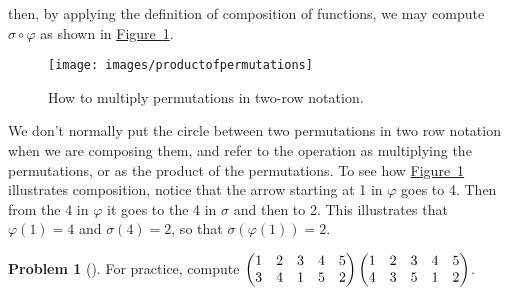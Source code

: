 \documentclass[10pt,]{book}
\theoremstyle{plain}
\theoremstyle{definition}
\newtheorem{activity}[project]{Problem}
\theoremstyle{definition}
\numberwithin{equation}{chapter}
\newcommand{\amp}{&}
\begin{document}
then, by applying the definition of composition of functions, we may compute \(\sigma\circ
\varphi\) as shown in \hyperref[permutationproduct]{Figure~\ref{permutationproduct}}.%
\begin{figure}
\centering
\texttt{[image: images/productofpermutations]}
\caption{How to multiply permutations in two-row notation.\label{permutationproduct}}
\end{figure}
\hypertarget{p-1500}{}%
We don't normally put the circle between two permutations in two row notation when we are composing them, and refer to the operation as multiplying the permutations, or as the product of the permutations. To see how \hyperref[permutationproduct]{Figure~\ref{permutationproduct}} illustrates composition, notice that the arrow starting at 1 in \(\varphi\) goes to 4. Then from the 4 in \(\varphi\) it goes to the 4 in \(\sigma\) and then to 2. This illustrates that \(\varphi(1)=4\) and \(\sigma(4) =2\), so that \(\sigma(\varphi(1))=2\).%
\begin{activity}[]\marginsymbol[-1em]{} \label{activity-258}
\hypertarget{p-1501}{}%
For practice, compute \(\begin{pmatrix}1\amp 2\amp 3\amp 4\amp 5\cr3\amp 4\amp 1\amp 5\amp 2
\end{pmatrix}
\begin{pmatrix}1\amp 2\amp 3\amp 4\amp 5\cr 4\amp 3\amp 5\amp 1\amp 2
\end{pmatrix}\).%
\end{activity}
\typeout{************************************************}
\typeout{************************************************}
\end{document}
